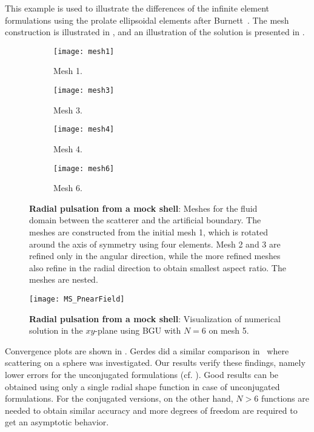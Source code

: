 This example is used to illustrate the differences of the infinite element formulations using the prolate ellipsoidal elements after Burnett~\cite{Burnett1994atd}. The mesh construction is illustrated in , and an illustration of the solution is presented in .
\begin{figure}
	\centering    
	\begin{subfigure}{0.49\textwidth}
		\centering
		\texttt{[image: mesh1]}
		\caption{Mesh 1.}
	\end{subfigure}%
	\hspace*{0.02\textwidth}%
	\begin{subfigure}{0.49\textwidth}
		\texttt{[image: mesh3]}
		\caption{Mesh 3.}
	\end{subfigure}
	\par\bigskip
	\begin{subfigure}{0.49\textwidth}
		\centering
		\texttt{[image: mesh4]}
		\caption{Mesh 4.}
	\end{subfigure}%
	\hspace*{0.02\textwidth}%
	\begin{subfigure}{0.49\textwidth}
		\texttt{[image: mesh6]}
		\caption{Mesh 6.}
	\end{subfigure}
	\caption{\textbf{Radial pulsation from a mock shell}: Meshes for the fluid domain between the scatterer and the artificial boundary. The meshes are constructed from the initial mesh 1, which is rotated around the axis of symmetry using four elements. Mesh 2 and 3 are refined only in the angular direction, while the more refined meshes also refine in the radial direction to obtain smallest aspect ratio. The meshes are nested.}
	\label{Fig2:MS_meshes}
\end{figure}
\begin{figure}
	\centering
	\texttt{[image: MS\_PnearField]}
	\caption{\textbf{Radial pulsation from a mock shell}: Visualization of numerical solution in the $xy$-plane using BGU with $N=6$ on mesh 5.}
	\label{Fig2:MS_visualization}
\end{figure}
Convergence plots are shown in . Gerdes did a similar comparison in~\cite{Gerdes1998tcv} where scattering on a sphere was investigated. Our results verify these findings, namely lower errors for the unconjugated formulations (cf. ). Good results can be obtained using only a single radial shape function in case of unconjugated formulations. For the conjugated versions, on the other hand, $N > 6$ functions are needed to obtain similar accuracy and more degrees of freedom are required to get an asymptotic behavior.


